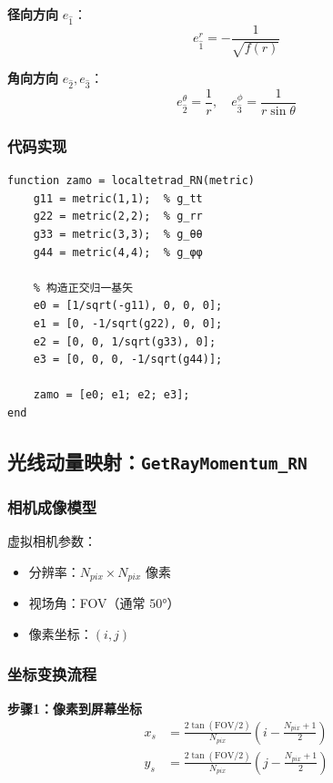 \documentclass[a4paper,12pt]{article}
\begin{document}
\textbf{径向方向} $e_{\hat{1}}$：
\begin{equation}
    e^r_{\hat{1}} = -\frac{1}{\sqrt{f(r)}}
\end{equation}

\textbf{角向方向} $e_{\hat{2}}, e_{\hat{3}}$：
\begin{equation}
    e^\theta_{\hat{2}} = \frac{1}{r}, \quad e^\phi_{\hat{3}} = \frac{1}{r\sin\theta}
\end{equation}

\subsubsection{代码实现}

\begin{lstlisting}[caption={局域标架构造}]
function zamo = localtetrad_RN(metric)
    g11 = metric(1,1);  % g_tt
    g22 = metric(2,2);  % g_rr
    g33 = metric(3,3);  % g_θθ
    g44 = metric(4,4);  % g_φφ
    
    % 构造正交归一基矢
    e0 = [1/sqrt(-g11), 0, 0, 0];
    e1 = [0, -1/sqrt(g22), 0, 0];
    e2 = [0, 0, 1/sqrt(g33), 0];
    e3 = [0, 0, 0, -1/sqrt(g44)];
    
    zamo = [e0; e1; e2; e3];
end
\end{lstlisting}

\subsection{光线动量映射：\texttt{GetRayMomentum\_RN}}

\subsubsection{相机成像模型}

虚拟相机参数：
\begin{itemize}
    \item 分辨率：$N_{pix} \times N_{pix}$ 像素
    \item 视场角：FOV（通常 $50°$）
    \item 像素坐标：$(i, j)$
\end{itemize}

\subsubsection{坐标变换流程}

\textbf{步骤1：像素到屏幕坐标}
\begin{align}
    x_s &= \frac{2\tan(\text{FOV}/2)}{N_{pix}} \left(i - \frac{N_{pix}+1}{2}\right) \\
    y_s &= \frac{2\tan(\text{FOV}/2)}{N_{pix}} \left(j - \frac{N_{pix}+1}{2}\right)
\end{align}
\end{document}
